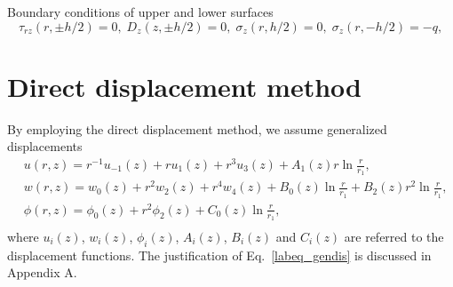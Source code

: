 \documentclass[12pt,sort&compress,fleqn,3p]{elsarticle}
\newcommand{\jiaobiao}[2]{ {#1} _ {#2} }
\begin{document}
Boundary conditions of upper and lower surfaces
\begin{equation}\label{labeq_bouncondi}
\tau_{rz}(r,\pm h/2)=0, \;  D_{z}(z,\pm h/2)=0, \;  \sigma_z(r,h/2)=0, \; \sigma_z(r,-h/2)=-q,
\end{equation}




\section{Direct displacement method}
By employing the direct displacement method, we assume generalized displacements
\begin{equation}\label{labeq_gendis}
\begin{split}
&u(r,z)=r^{-1}\jiaobiao{u}{-1}(z)+r\jiaobiao{u}{1}(z)+r^{3}\jiaobiao{u}{3}(z)+\jiaobiao{A}{1}(z)r\ln\frac{r}{r_1},\\
&w(r,z)=\jiaobiao{w}{0}(z)+r^{2}\jiaobiao{w}{2}(z)+r^{4}\jiaobiao{w}{4}(z)+\jiaobiao{B}{0}(z)\ln\frac{r}{r_1}+\jiaobiao{B}{2}(z)r^{2}\ln\frac{r}{r_1},\\
&\phi(r,z)=\jiaobiao{\phi}{0}(z)+r^{2}\jiaobiao{\phi}{2}(z)+\jiaobiao{C}{0}(z)\ln\frac{r}{r_1},\\
\end{split}
\end{equation}
where $u_i(z)$, $w_i(z)$, $\phi_i(z)$, $A_i(z)$, $B_i(z)$ and $C_i(z)$ are referred to the displacement functions. The justification of Eq.~\eqref{labeq_gendis} is discussed in Appendix A.
\end{document}
